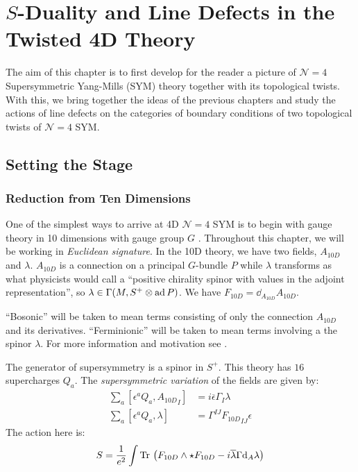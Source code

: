 \chapter{$S$-Duality and Line Defects in the Twisted 4D Theory\label{ch:finale}}

The aim of this chapter is to first develop for the reader a picture of $\mathcal N = 4$ Supersymmetric Yang-Mills (SYM) theory together with its topological twists. With this, we bring together the ideas of the previous chapters and study the actions of line defects on the categories of boundary conditions of two topological twists of $\mathcal N=4$ SYM.

\section{Setting the Stage} %
\label{sec:setting_the_stage}

\subsection{Reduction from Ten Dimensions} %
\label{sub:reduction_from_ten_dimensions}

One of the simplest ways to arrive at 4D $\mathcal N=4$ SYM is to begin with gauge theory in 10 dimensions with gauge group $G$ \cite{kapustin2006}. Throughout this chapter, we will be working in \emph{Euclidean signature}. In the 10D theory, we have two fields, $A_{10D}$ and $\lambda$. $A_{10D}$ is a connection on a principal $G$-bundle $P$ while $\lambda$ transforms as what physicists would call a ``positive chirality spinor with values in the adjoint representation'', so $\lambda \in \Gamma(M, S^+ \otimes \mathrm{ad}\, P)$. We have $F_{10D} = \dd_{A_{10D}} A_{10D}$.

``Bosonic'' will be taken to mean terms consisting of only the connection $A_{10D}$ and its derivatives. ``Ferminionic'' will be taken to mean terms involving a the spinor $\lambda$. For more information and motivation see \cite{schwartz2014}.

The generator of supersymmetry is a spinor in $S^+$. This theory has $16$ supercharges $Q_a$. The \emph{supersymmetric variation} of the fields are given by:
\[
\begin{aligned}
	\sum_a [\epsilon^a Q_a, {A_{10D}}_I] &= i \overline \epsilon \Gamma_I \lambda\\
	\sum_a [\epsilon^a Q_a, \lambda] &= \Gamma^{IJ} {F_{10D}}_{IJ} \epsilon
\end{aligned}	
\]
The action here is:
\begin{equation}
	S = \frac{1}{e^2} \int \mathrm{Tr}\, \left(F_{10D} \wedge \star F_{10D} - i \overline \lambda \Gamma \mathrm{d}_A \lambda \right) 
\end{equation}

